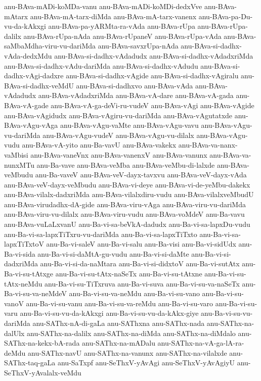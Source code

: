 {anu-BAva-mADi-koMDa-vanu
anu-BAva-mADi-koMDi-dedxVve
anu-BAva-mAtarx
anu-BAva-mA-tarx-diMda
anu-BAva-mA-tarx-vanenx
anu-BAva-pa-Du-vu-da-kAkxgi
anu-BAva-pa-yARMta-ra-vAda
anu-BAva-rUpa
anu-BAva-rUpa-dalilx
anu-BAva-rUpa-nAda
anu-BAva-rUpaneV
anu-BAva-rUpa-vAda
anu-BAva-saMbaMdha-viru-vu-dariMda
anu-BAva-savxrUpa-nAda
anu-BAva-si-dadhx-vAda-dedxMdu
anu-BAva-si-dadhx-vAdadudx
anu-BAva-si-dadhx-vAdadxriMda
anu-BAva-si-dadhx-vAdu-dariMda
anu-BAva-si-dadhx-vAdudu
anu-BAva-si-dadhx-vAgi-dadxre
anu-BAva-si-dadhx-vAgide
anu-BAva-si-dadhx-vAgiralu
anu-BAva-si-dadhx-veMdU
anu-BAva-si-dadhxvo
anu-BAva-vAda
anu-BAva-vAdadudx
anu-BAva-vAdadxriMda
anu-BAva-vA-dare
anu-BAva-vA-gada
anu-BAva-vA-gade
anu-BAva-vA-ga-deVi-ru-vudeV
anu-BAva-vAgi
anu-BAva-vAgide
anu-BAva-vAgidudx
anu-BAva-vAgiru-vu-dariMda
anu-BAva-vAgutatxde
anu-BAva-vAgu-vAga
anu-BAva-vAgu-vaMte
anu-BAva-vAgu-vavu
anu-BAva-vAgu-vu-dariMda
anu-BAva-vAgu-vudeV
anu-BAva-vAgu-vu-dilalx
anu-BAva-vAgu-vudu
anu-BAva-vA-yito
anu-Ba-vavU
anu-BAva-vakekx
anu-BAva-va-nanx-vaMbisi
anu-BAva-vaneVnx
anu-BAva-vanenxV
anu-BAva-vanunx
anu-BAva-va-nunxMTu
anu-Ba-vave
anu-BAva-veMba
anu-BAva-veMbu-di-lalxde
anu-BAva-veMbudu
anu-Ba-vaveV
anu-BAva-veV-dayx-tavxvu
anu-BAva-veV-dayx-vAda
anu-BAva-veV-dayx-veMbudu
anu-BAva-vi-deye
anu-BAva-vi-de-yeMbu-dakekx
anu-BAva-vilalx-dadxriMda
anu-BAva-vilalxdiru-vudu
anu-BAva-vilalxveMbudU
anu-BAva-virudadhx-dA-gide
anu-BAva-viru-vAga
anu-BAva-viru-vu-dariMda
anu-BAva-viru-vu-dilalx
anu-BAva-viru-vudu
anu-BAva-voMdeV
anu-Ba-vavu
anu-BAva-vuLaLxvanU
anu-Ba-vi-sa-beVkA-dadudx
anu-Ba-vi-sa-lapxDu-vudu
anu-Ba-vi-sa-lapxTiTxru-vu-dariMda
anu-Ba-vi-sa-lapxTiTxto
anu-Ba-vi-sa-lapxTiTxtoV
anu-Ba-vi-saleV
anu-Ba-vi-salu
anu-Ba-visi
anu-Ba-vi-sidUdx
anu-Ba-vi-sida
anu-Ba-vi-si-daMtA-gu-vudu
anu-Ba-vi-si-daMte
anu-Ba-vi-si-dadxriMda
anu-Ba-vi-si-da-naMtara
anu-Ba-vi-si-didxtoV
anu-Ba-vi-sutAtx
anu-Ba-vi-su-tAtxge
anu-Ba-vi-su-tAtx-naSeTx
anu-Ba-vi-su-tAtxne
anu-Ba-vi-su-tAtx-neMdu
anu-Ba-vi-su-TiTxruva
anu-Ba-vi-suva
anu-Ba-vi-su-va-naSeTx
anu-Ba-vi-su-va-neMdeV
anu-Ba-vi-su-va-neMdu
anu-Ba-vi-su-vano
anu-Ba-vi-su-vanoV
anu-Ba-vi-su-vanu
anu-Ba-vi-su-va-reMdu
anu-Ba-vi-su-varo
anu-Ba-vi-su-varu
anu-Ba-vi-su-vu-da-kAkxgi
anu-Ba-vi-su-vu-da-kAkx-giye
anu-Ba-vi-su-vu-dariMda
anu-SAThx-nA-di-gaLa
anu-SAThxna
anu-SAThx-nada
anu-SAThx-na-dalUlx
anu-SAThx-na-dalilx
anu-SAThx-na-diMda
anu-SAThx-na-diMdalo
anu-SAThx-na-kekx-bA-rada
anu-SAThx-na-mADalu
anu-SAThx-na-vA-ga-lA-ra-deMdu
anu-SAThx-navU
anu-SAThx-na-vanunx
anu-SAThx-na-vilalxde
anu-SAThx-taq-gaLa
anu-SaTxpf
anu-SeThxV-yAvAgi
anu-SeThxV-yAvAgiyU
anu-SeThxV-yAvalalx-veMdu
}

